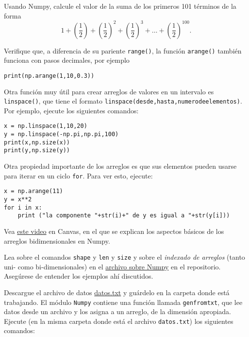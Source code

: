 \documentclass[11pt]{exam}
\begin{document}
\begin{questions}
\item Usando Numpy, calcule el valor de la suma de los primeros 101 términos de la forma
\begin{equation}
1+\left(\frac{1}{2}\right)+\left(\frac{1}{2}\right)^2+\left(\frac{1}{2}\right)^3+\dots +\left(\frac{1}{2}\right)^{100}.
\end{equation}
\item Verifique que, a diferencia de su pariente \texttt{range()}, la función \texttt{arange()} también funciona con pasos decimales, por ejemplo

\begin{verbatim}
print(np.arange(1,10,0.3))
\end{verbatim}

\item Otra función muy útil para crear arreglos de valores en un intervalo es \texttt{linspace()}, que tiene el formato \texttt{linspace(desde,hasta,numerodeelementos)}. Por ejemplo, ejecute los siguientes comandos:

\begin{verbatim}
x = np.linspace(1,10,20)
y = np.linspace(-np.pi,np.pi,100)
print(x,np.size(x))
print(y,np.size(y))
\end{verbatim}

\item Otra propiedad importante de los arreglos es que sus elementos pueden usarse para iterar en un ciclo \texttt{for}. Para ver esto, ejecute:

\begin{verbatim}
x = np.arange(11)
y = x**2
for i in x:
	print ("la componente "+str(i)+" de y es igual a "+str(y[i]))
\end{verbatim}

\item Vea \href{https://udec.instructure.com/courses/40179/pages/numpy-02}{este video} en Canvas, en el que se explican los aspectos básicos de los arreglos bidimensionales en Numpy.
 
\item Lea sobre el comandos \texttt{shape} y \texttt{len} y \texttt{size} y sobre el\textit{ indexado de arreglos} (tanto uni- como bi-dimensionales) en el \href{https://github.com/gfrubi/CC/blob/master/Python/02-Numpy.ipynb}{archivo sobre Numpy} en el repositorio. Asegúrese de entender los ejemplos ahí discutidos.

\item Descargue el archivo de datos \href{https://udec.instructure.com/courses/29314/files/folder/guias?preview=2014739}{datos.txt} y guárdelo en la carpeta donde está trabajando. El módulo \texttt{Numpy} contiene una función llamada \texttt{genfromtxt}, que lee datos desde un archivo y los asigna a un arreglo, de la dimensión apropiada. Ejecute (en la misma carpeta donde está el archivo \texttt{datos.txt}) los siguientes comandos:


\end{questions}
\end{document}
